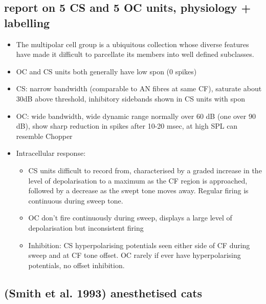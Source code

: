 \documentclass[10pt,a4paper]{article}
\begin{document}
\subsection{\citep{SmithRhode:1989} report on 5 CS and 5 OC units, physiology + labelling}


\begin{itemize}
\item The multipolar cell group is a ubiquitous collection whose diverse
  features have made it difficult to parcellate its members into well defined
  subclasses.
\item OC and CS units both generally have low spon (0 spikes)
\item CS: narrow bandwidth (comparable to AN fibres at same CF), saturate about
  30dB above threshold, inhibitory sidebands shown in CS units with spon
\item OC: wide bandwidth, wide dynamic range normally over 60 dB (one over 90
  dB), show sharp reduction in spikes after 10-20 msec, at high SPL can resemble
  Chopper
\item Intracellular response:

  \begin{itemize}
  \item CS units difficult to record from, characterised by a graded increase in
    the level of depolarisation to a maximum as the CF region is approached,
    followed by a decrease as the swept tone moves away.  Regular firing is
    continuous during sweep tone.
  \item OC don{\textquoteright}t fire continuously during sweep, displays a
    large level of depolarisation but inconsistent firing
  \item Inhibition: CS hyperpolarising potentials seen either side of CF during
    sweep and at CF tone offset.  OC rarely if ever have hyperpolarising
    potentials, no offset inhibition.
  \end{itemize}
\end{itemize}

\subsection{(Smith et al. 1993) anesthetised cats}
\end{document}
